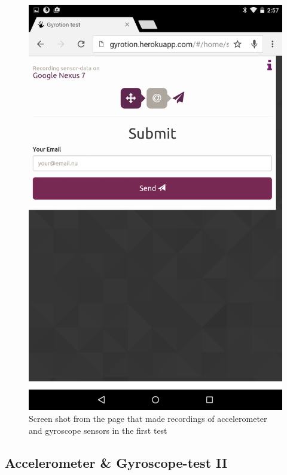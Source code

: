 \begin{figure}[H]
  \begin{minipage}[c]{.23\textwidth}
    \centering
    \includegraphics[scale=0.1]{img/Nexus-submit}
  \end{minipage}
  \caption{Screen shot from the page that  made recordings of accelerometer and gyroscope sensors in the first test}
  \label{fig:gyrotion}
\end{figure}

\subsection{Accelerometer \& Gyroscope-test II}

